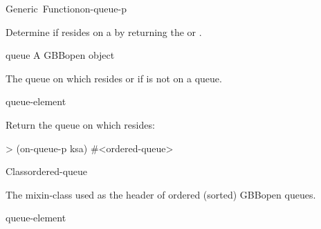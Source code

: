 \documentclass[10pt,twoside,english,pdftex]{article}
\begin{document}
\begin{functiondoc}{Generic~Function}{on-queue-p}{ 
    \returns{} }
%
%

\fnsyntax

\fnpurpose Determine if  resides on a
  by returning the  or \nil.

\fnmethods
{}

\fnpackage {}

\fnmodule {}

\fnargs
\begin{args}{queue}
 A GBBopen  object
\end{args}

\fnreturns The  queue on which 
resides or \nil{} if  is not on a queue.
  
\begin{alsos}{queue-element}
\end{alsos}

\fnexample
Return the queue on which  resides:
\begin{example}
> (on-queue-p ksa)
#<ordered-queue>
\end{example}

\end{functiondoc}


\begin{functiondoc}{Class}{ordered-queue}{}
%

\fnsyntax

\fnpackage {}

\fnmodule {}

\fndescription The mixin-class used as the header of ordered (sorted) 
GBBopen queues.

\begin{alsos}{queue-element}
\also[queue]
\end{alsos}

\end{functiondoc}
\end{document}
